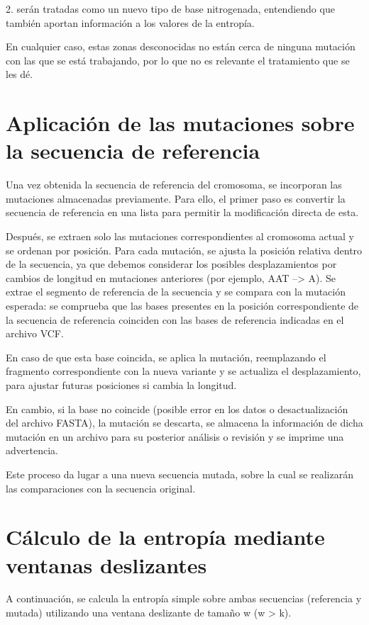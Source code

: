 \documentclass[11pt,spanish,listoffigures,listoftables]{tfgetsinf}
\begin{document}
2. serán tratadas como un nuevo tipo de base nitrogenada, entendiendo que también aportan información a los valores de la entropía. 

En cualquier caso, estas zonas desconocidas no están cerca de ninguna mutación con las que se está trabajando, por lo que no es relevante el tratamiento que se les dé. 

\section{Aplicación de las mutaciones sobre la secuencia de referencia}

Una vez obtenida la secuencia de referencia del cromosoma, se incorporan las mutaciones almacenadas previamente. Para ello, el primer paso es convertir la secuencia de referencia en una lista para permitir la modificación directa de esta. 

Después, se extraen solo las mutaciones correspondientes al cromosoma actual y se ordenan por posición. Para cada mutación, se ajusta la posición relativa dentro de la secuencia, ya que debemos considerar los posibles desplazamientos por cambios de longitud en mutaciones anteriores (por ejemplo, AAT --> A). Se extrae el segmento de referencia de la secuencia y se compara con la mutación esperada: se comprueba que las bases presentes en la posición correspondiente de la secuencia de referencia coinciden con las bases de referencia indicadas en el archivo VCF. 

En caso de que esta base coincida, se aplica la mutación, reemplazando el fragmento correspondiente con la nueva variante y se actualiza el desplazamiento, para ajustar futuras posiciones si cambia la longitud. 

En cambio, si la base no coincide (posible error en los datos o desactualización del archivo FASTA), la mutación se descarta, se almacena la información de dicha mutación en un archivo para su posterior análisis o revisión y se imprime una advertencia. 

Este proceso da lugar a una nueva secuencia mutada, sobre la cual se realizarán las comparaciones con la secuencia original. 

\section{Cálculo de la entropía mediante ventanas deslizantes}

A continuación, se calcula la entropía simple sobre ambas secuencias (referencia y mutada) utilizando una ventana deslizante de tamaño w (w > k). 
\end{document}
